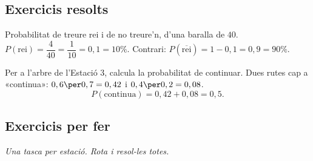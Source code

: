 \subsection{Exercicis resolts}

\begin{exresolt}
Probabilitat de treure rei i de no treure'n, d'una baralla de $40$.
\solucio
$P(\text{rei})=\dfrac{4}{40}=\dfrac{1}{10}=0,1=10\%$. Contrari:
$P(\overline{\text{rei}})=1-0,1=0,9=90\%$.
\end{exresolt}

\begin{exresolt}
Per a l'arbre de l'Estació 3, calcula la probabilitat de continuar.
\solucio
Dues rutes cap a «continua»: $0,6\per 0,7=0,42$ i $0,4\per 0,2=0,08$.
\[
P(\text{continua})=0,42+0,08=0,5.
\]
\end{exresolt}

\subsection{Exercicis per fer}

\noindent\textit{Una tasca per estació. Rota i resol-les totes.}

